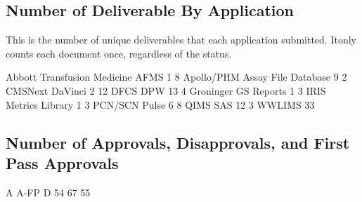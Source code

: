 \documentclass{article}
\begin{document}
\subsection{Number of Deliverable By Application}
This is the number of unique deliverables that each application submitted. Itonly counts
each document once, regardless of the status.
\begin{Schunk}
\begin{Soutput}
Abbott Transfusion Medicine                        AFMS 
                          1                           8 
                 Apollo/PHM         Assay File Database 
                          9                           2 
                    CMSNext                     DaVinci 
                          2                          12 
                       DFCS                         DPW 
                         13                           4 
                  Groninger                  GS Reports 
                          1                           3 
                       IRIS             Metrics Library 
                          1                           3 
                    PCN/SCN                       Pulse 
                          6                           8 
                       QIMS                         SAS 
                         12                           3 
                     WWLIMS 
                         33 
\end{Soutput}
\end{Schunk}

\subsection{Number of Approvals, Disapprovals, and First Pass Approvals}

\begin{Schunk}
\begin{Soutput}
   A A-FP    D 
  54   67   55 
\end{Soutput}
\end{Schunk}
\end{document}
